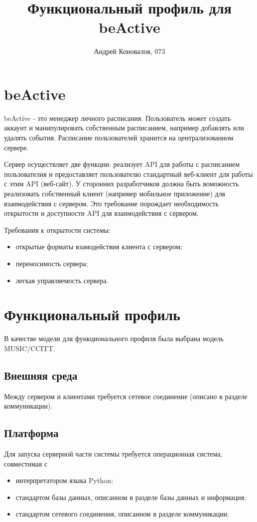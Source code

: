 \documentclass[10pt]{article}
\title{Функциональный профиль для beActive}
\author{Андрей Коновалов, 073}
\date{}
\begin{document}
\maketitle

\section{beActive}

beActive - это менеджер личного расписания.
Пользователь может создать аккаунт и манипулировать собственным расписанием, например добавлять или удалять события.
Расписание пользователей хранится на централизованном сервере.

Сервер осуществляет две функции: реализует API для работы с расписанием пользователия и предоставляет пользователю стандартный веб-клиент для работы с этим API (веб-сайт).
У сторонних разработчиков должна быть воможность реализовать собственный клиент (например мобильное приложение) для взаимодействия с сервером.
Это требование порождает необходимость открытости и доступности API для взаимодействия с сервером. 

Требования к открытости системы:
\begin{itemize}
  \item открытые форматы взамодействия клиента с сервером;
  \item переносимость сервера;
  \item легкая управляемость сервера.
\end{itemize}

\section{Функциональный профиль}

В качестве модели для функционального профиля была выбрана модель MUSIC/CCITT.

\subsection{Внешняя среда}

Между сервером и клиентами требуется сетевое соединение (описано в разделе коммуникации).

\subsection{Платформа}

Для запуска серверной части системы требуется операционная система, совместимая с
\begin{itemize}
  \item интерпретатором языка Python;
  \item стандартом базы данных, описанном в разделе базы данных и информация;
  \item стандартом сетевого соединения, описанном в разделе коммуникации.
\end{itemize}
\end{document}

